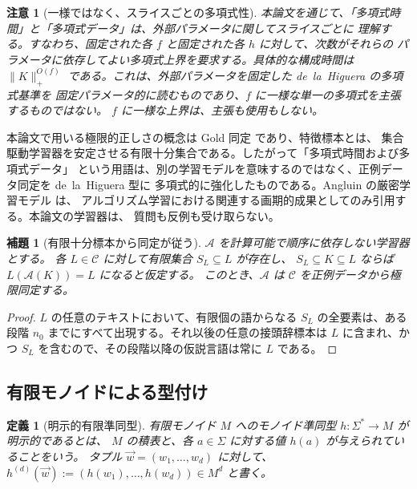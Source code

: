\documentclass[11pt,a4paper]{ltjsarticle}
\newtheorem{lemma}[theorem]{補題}
\newtheorem{definition}[theorem]{定義}
\newtheorem{remark}[theorem]{注意}
\theoremstyle{remark}
\newcommand{\tuple}[1]{\vec{#1}}
\begin{document}
\begin{remark}[一様ではなく、スライスごとの多項式性]
\label{rem:slicewise-poly}
本論文を通じて、「多項式時間」と「多項式データ」は、外部パラメータに関してスライスごとに
理解する。すなわち、固定された各 \(f\) と固定された各 \(h\) に対して、次数がそれらの
パラメータに依存してよい多項式上界を要求する。具体的な構成時間は
\(\|K\|_+^{O(f)}\) である。これは、外部パラメータを固定した de~la~Higuera の多項式基準を
固定パラメータ的に読むものであり、\(f\) に一様な単一の多項式を主張するものではない。
\(f\) に一様な上界は、主張も使用もしない。
\end{remark}

本論文で用いる極限的正しさの概念は Gold 同定 \cite{Gold1967} であり、特徴標本とは、
集合駆動学習器を安定させる有限十分集合である。したがって「多項式時間および多項式データ」
という用語は、別の学習モデルを意味するのではなく、正例データ同定を de~la~Higuera 型に
多項式的に強化したものである。Angluin の厳密学習モデル \cite{Angluin1987} は、
アルゴリズム学習における関連する画期的成果としてのみ引用する。本論文の学習器は、
質問も反例も受け取らない。

\begin{lemma}[有限十分標本から同定が従う]
\label{lem:sufficient-to-gold}
\(\mathcal A\) を計算可能で順序に依存しない学習器とする。
各 \(L\in\mathcal C\) に対して有限集合 \(S_L\subseteq L\) が存在し、
\(S_L\subseteq K\subseteq L\) ならば \(L(\mathcal A(K))=L\) になると仮定する。
このとき、\(\mathcal A\) は \(\mathcal C\) を正例データから極限同定する。
\end{lemma}

\begin{proof}
\(L\) の任意のテキストにおいて、有限個の語からなる \(S_L\) の全要素は、ある段階
\(n_0\) までにすべて出現する。それ以後の任意の接頭辞標本は \(L\) に含まれ、かつ
\(S_L\) を含むので、その段階以降の仮説言語は常に \(L\) である。
\end{proof}

\subsection{有限モノイドによる型付け}

\begin{definition}[明示的有限準同型]
有限モノイド \(M\) へのモノイド準同型 \(h\colon\Sigma^*\to M\) が\emph{明示的}であるとは、
\(M\) の積表と、各 \(a\in\Sigma\) に対する値 \(h(a)\) が与えられていることをいう。
タプル \(\tuple w=(w_1,\ldots,w_d)\) に対して、
\(h^{(d)}(\tuple w):=(h(w_1),\ldots,h(w_d))\in M^d\) と書く。
\end{definition}
\end{document}
